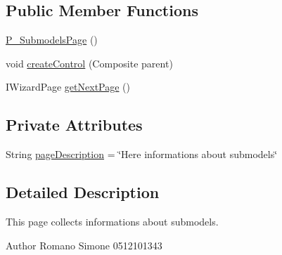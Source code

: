 \subsection*{Public Member Functions}
\begin{DoxyCompactItemize}
\item 
\hyperlink{classit_1_1isislab_1_1masonassisteddocumentation_1_1mason_1_1wizards_1_1_p___submodels_page_a7a92049ccd52e2fa42340efd01c2f0f7}{P\-\_\-\-Submodels\-Page} ()
\item 
void \hyperlink{classit_1_1isislab_1_1masonassisteddocumentation_1_1mason_1_1wizards_1_1_p___submodels_page_a57d780143ffee9a1e0b3ad3558ec4b19}{create\-Control} (Composite parent)
\item 
I\-Wizard\-Page \hyperlink{classit_1_1isislab_1_1masonassisteddocumentation_1_1mason_1_1wizards_1_1_p___submodels_page_a9a5a3f7b6ea23196b79f6bf1268f8d83}{get\-Next\-Page} ()
\end{DoxyCompactItemize}
\subsection*{Private Attributes}
\begin{DoxyCompactItemize}
\item 
String \hyperlink{classit_1_1isislab_1_1masonassisteddocumentation_1_1mason_1_1wizards_1_1_p___submodels_page_afb144ac90c77af090ce257b12ea885ce}{page\-Description} = \char`\"{}Here informations about submodels\char`\"{}
\end{DoxyCompactItemize}


\subsection{Detailed Description}
This page collects informations about submodels. \begin{DoxyAuthor}{Author}
Romano Simone 0512101343 
\end{DoxyAuthor}


